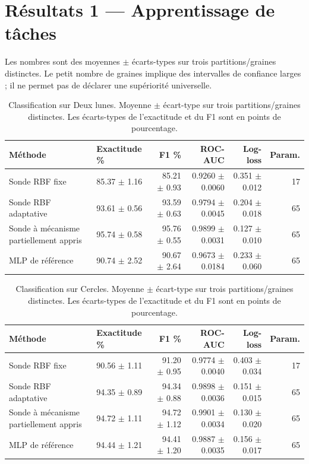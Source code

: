 \documentclass[11pt,a4paper]{article}
\begin{document}
\section{Résultats 1 — Apprentissage de tâches}
Les nombres sont des moyennes $\pm$ écarts-types sur trois partitions/graines distinctes. Le petit nombre de graines implique des intervalles de confiance larges ; il ne permet pas de déclarer une supériorité universelle.
\begin{table}[htbp]
\centering
\small
\setlength{\tabcolsep}{4pt}
\renewcommand{\arraystretch}{1.08}
\begin{tabular}{llrrrr}
\toprule
Méthode & Exactitude \% & F1 \% & ROC-AUC & Log-loss & Param. \\
\midrule
Sonde RBF fixe & 85.37 $\pm$ 1.16 & 85.21 $\pm$ 0.93 & 0.9260 $\pm$ 0.0060 & 0.351 $\pm$ 0.012 & 17 \\
Sonde RBF adaptative & 93.61 $\pm$ 0.56 & 93.59 $\pm$ 0.63 & 0.9794 $\pm$ 0.0045 & 0.204 $\pm$ 0.018 & 65 \\
Sonde à mécanisme partiellement appris & 95.74 $\pm$ 0.58 & 95.76 $\pm$ 0.55 & 0.9899 $\pm$ 0.0031 & 0.127 $\pm$ 0.010 & 65 \\
MLP de référence & 90.74 $\pm$ 2.52 & 90.67 $\pm$ 2.64 & 0.9673 $\pm$ 0.0184 & 0.233 $\pm$ 0.060 & 65 \\
\bottomrule
\end{tabular}
\caption{Classification sur Deux lunes. Moyenne $\pm$ écart-type sur trois partitions/graines distinctes. Les écarts-types de l'exactitude et du F1 sont en points de pourcentage.}
\label{tab:class_two_moons}
\end{table}
\begin{table}[htbp]
\centering
\small
\setlength{\tabcolsep}{4pt}
\renewcommand{\arraystretch}{1.08}
\begin{tabular}{llrrrr}
\toprule
Méthode & Exactitude \% & F1 \% & ROC-AUC & Log-loss & Param. \\
\midrule
Sonde RBF fixe & 90.56 $\pm$ 1.11 & 91.20 $\pm$ 0.95 & 0.9774 $\pm$ 0.0040 & 0.403 $\pm$ 0.034 & 17 \\
Sonde RBF adaptative & 94.35 $\pm$ 0.89 & 94.34 $\pm$ 0.88 & 0.9898 $\pm$ 0.0036 & 0.151 $\pm$ 0.015 & 65 \\
Sonde à mécanisme partiellement appris & 94.72 $\pm$ 1.11 & 94.72 $\pm$ 1.12 & 0.9901 $\pm$ 0.0034 & 0.130 $\pm$ 0.020 & 65 \\
MLP de référence & 94.44 $\pm$ 1.21 & 94.41 $\pm$ 1.20 & 0.9887 $\pm$ 0.0035 & 0.156 $\pm$ 0.017 & 65 \\
\bottomrule
\end{tabular}
\caption{Classification sur Cercles. Moyenne $\pm$ écart-type sur trois partitions/graines distinctes. Les écarts-types de l'exactitude et du F1 sont en points de pourcentage.}
\label{tab:class_circles}
\end{table}
\end{document}
